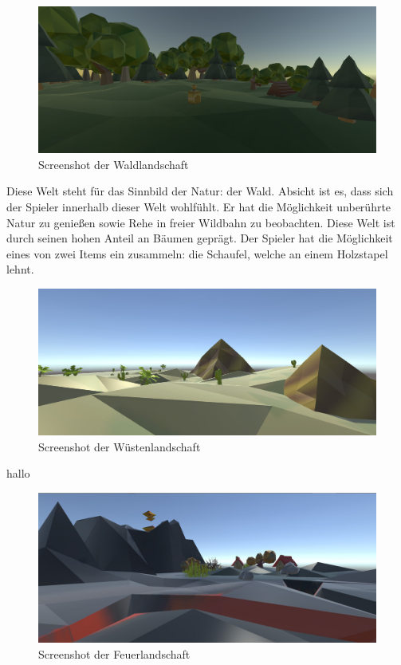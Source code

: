 
\begin{figure}[!htbp]%
	\centering
		\includegraphics[width=1.0\textwidth]{images/Wald}
	\caption{Screenshot der Waldlandschaft}
	\label{fig:Wald}
\end{figure}

Diese Welt steht für das Sinnbild der Natur: der Wald. Absicht ist es, dass sich der Spieler innerhalb dieser Welt wohlfühlt. Er hat die Möglichkeit unberührte Natur zu genießen sowie Rehe in freier Wildbahn zu beobachten. Diese Welt ist durch seinen hohen Anteil an Bäumen geprägt. Der Spieler hat die Möglichkeit eines von zwei Items ein zusammeln: die Schaufel, welche an einem Holzstapel lehnt.


\begin{figure}[!htbp]%
	\centering
		\includegraphics[width=1.0\textwidth]{images/Wueste}
	\caption{Screenshot der Wüstenlandschaft}
	\label{fig:Wueste}
\end{figure}

hallo


\begin{figure}[!htbp]%
	\centering
		\includegraphics[width=1.0\textwidth]{images/Feuer}
	\caption{Screenshot der Feuerlandschaft}
	\label{fig:Feuer}
\end{figure}

